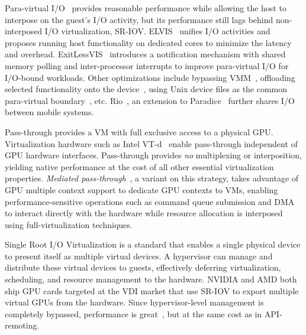 Para-virtual I/O~\cite{harel-efficient13atc,exitless-paravirtual-io,
vmm-bypass-atc06,self-virt-hpdc07,vmware-hosted-io-atc01,
direct-access-virt-io-atc08,self-virt-hpdc07,paradice} provides reasonable
performance while allowing the host to interpose on the guest's I/O activity,
but its performance still lags behind non-interposed I/O virtualization, SR-IOV.
ELVIS~\cite{harel-efficient13atc} unifies I/O activities and proposes running
host functionality on dedicated cores to minimize the latency and overhead.
ExitLessVIS~\cite{exitless-paravirtual-io} introduces a notification mechanism
with shared memory polling and inter-processor interrupts to improve
para-virtual I/O for I/O-bound workloads.
Other optimizations include bypassing VMM~\cite{vmm-bypass-atc06,
vmware-hosted-io-atc01,direct-access-virt-io-atc08},
offloading selected functionality onto the device~\cite{self-virt-hpdc07},
using Unix device files as the common para-virtual boundary~\cite{paradice},
etc. Rio~\cite{AmiriSani:2014:RSS:2594368.2594370}, an extension to Paradice~\cite{paradice} further shares I/O between mobile systems.

Pass-through provides a VM with full exclusive access to a physical GPU.
Virtualization hardware such as Intel VT-d~\cite{abramson2006intel} enable
pass-through independent of GPU hardware interfaces. Pass-through
provides \emph{no} multiplexing or interposition, yielding native performance
at the cost of all other essential virtualization properties.
\emph{Mediated pass-through}~\cite{gVirt}, a variant on this strategy,
takes advantage of GPU multiple context support to dedicate GPU contexts
to VMs, enabling performance-sensitive operations such as command queue
submission and DMA to interact directly with the hardware while resource
allocation is interposed using full-virtualization techniques.

Single Root I/O Virtualization is a standard that enables a single physical
device to present itself as multiple virtual devices. A hypervisor can manage
and distribute these virtual devices to guests, effectively deferring
virtualization, scheduling, and resource management to the hardware. NVIDIA
and AMD both ship GPU cards targeted at the VDI market that use SR-IOV to
export multiple virtual GPUs from the hardware. Since hypervisor-level
management is completely bypassed, performance is great~\cite{Dong:2008:SNX:1855865.1855875}, but at the same cost
as in API-remoting.